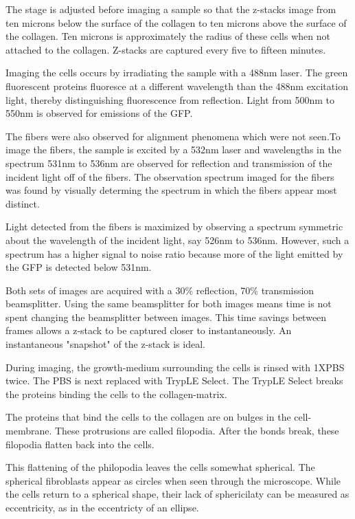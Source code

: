 \documentclass[ twocolumn,notitlepage]{ revtex4-1}
\begin{document}
The stage is adjusted before imaging a sample so that the z-stacks image from ten microns below the surface of the collagen to ten microns above the surface of the collagen. Ten microns is approximately the radius of these cells when not attached to the collagen. Z-stacks are captured every five to fifteen minutes.

Imaging the cells occurs by irradiating the sample with a 488nm laser. The green fluorescent proteins fluoresce at a different wavelength than the 488nm excitation light, thereby distinguishing fluorescence from reflection. Light from 500nm to 550nm is observed for emissions of the GFP. 

The fibers were also observed for alignment phenomena which were not seen.To image the fibers, the sample is excited by a 532nm laser and wavelengths in the spectrum 531nm to 536nm are observed for reflection and transmission of the incident light off of the fibers. The observation spectrum imaged for the fibers was found by visually determing the spectrum in which the fibers appear most distinct.

Light detected from the fibers is maximized by observing a spectrum symmetric about the wavelength of the incident light, say 526nm to 536nm. However, such a spectrum has a higher signal to noise ratio because more of the light emitted by the GFP is detected below 531nm.

Both sets of images are acquired with a 30\% reflection, 70\% transmission beamsplitter. Using the same beamsplitter for both images means time is not spent changing the beamsplitter between images. This time savings between frames allows a z-stack to be captured closer to instantaneously. An instantaneous "snapshot" of the z-stack is ideal. 

During imaging, the growth-medium surrounding the cells is rinsed with 1XPBS twice. The PBS is next replaced with TrypLE Select. The TrypLE Select breaks the proteins binding the cells to the collagen-matrix.

The proteins that bind the cells to the collagen are on bulges in the cell-membrane. These protrusions are called filopodia. After the bonds break, these filopodia flatten back into the cells.

This flattening of the philopodia leaves the cells somewhat spherical. The spherical fibroblasts appear as circles when seen through the microscope. While the cells return to a spherical shape, their lack of sphericilaty can be measured as eccentricity, as in the eccentricty of an ellipse.
\end{document}
